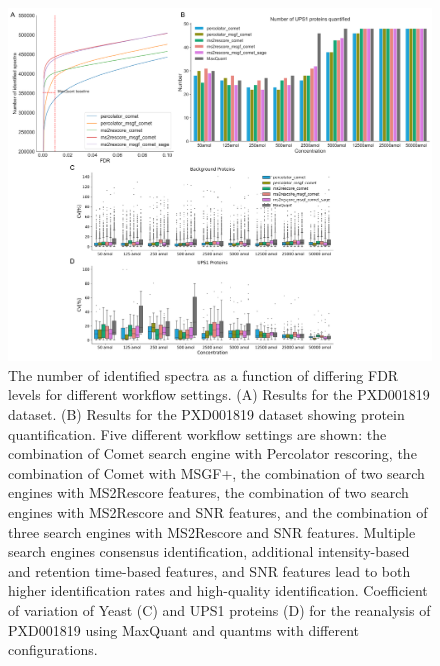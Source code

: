 \documentclass[12pt]{article}
\begin{document}
\begin{figure}[ht!]
	\centering
	\includegraphics[width=1\textwidth]{figures//PXD001819_V3.png}
	\caption{The number of identified spectra as a function of differing FDR levels for different workflow settings. (A) Results for the PXD001819 dataset. (B) Results for the PXD001819 dataset showing protein quantification. Five different workflow settings are shown: the combination of Comet search engine with Percolator rescoring, the combination of Comet with MSGF+, the combination of two search engines with MS2Rescore features, the combination of two search engines with MS2Rescore and SNR features, and the combination of three search engines with MS2Rescore and SNR features. Multiple search engines consensus identification, additional intensity-based and retention time-based features, and SNR features lead to both higher identification rates and high-quality identification. Coefficient of variation of Yeast (C) and UPS1 proteins (D) for the reanalysis of PXD001819 using MaxQuant and quantms with different configurations.}
	\label{fig:PXD001819_ms2rescore_pic}
\end{figure}
\end{document}
